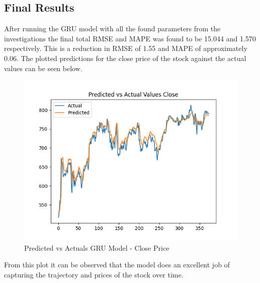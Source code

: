 \documentclass[10pt,twocolumn,letterpaper]{article}
\newcommand{\squeezeup}{\vspace{-10.0mm}}
\begin{document}
\subsection{Final Results}
After running the GRU model with all the found parameters from the investigations 
the final total RMSE and MAPE was found to be 15.044 and 1.570 respectively. This 
is a reduction in RMSE of 1.55 and MAPE of approximately 0.06. The plotted predictions 
for the close price of the stock against the actual values can be seen below.
\begin{center}
   \begin{figure}[H]
   \includegraphics[scale=0.5]{GRU_Close.png}
   \caption{Predicted vs Actuals GRU Model - Close Price }
   \end{figure}
 \end{center}
 \squeezeup
From this plot it can be observed that the model does an excellent job of capturing the 
trajectory and prices of the stock over time.
\end{document}
